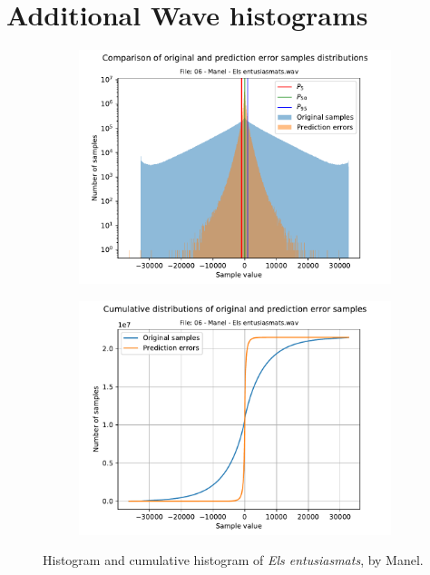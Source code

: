 \chapter{Additional Wave histograms} \label{ch:wave_hists}
\begin{figure}[h!]
	\centering
	\begin{subfigure}{0.45\textwidth}
		\centering
		\includegraphics[width=\linewidth]{images/wave_hists/06 - Manel - Els entusiasmats.wav_hist.pdf}
	\end{subfigure}%
	\begin{subfigure}{0.45\textwidth}
		\centering
		\includegraphics[width=\linewidth]{images/wave_hists/06 - Manel - Els entusiasmats.wav_hist_cum.pdf}
	\end{subfigure}
	\caption{Histogram and cumulative histogram of \textit{Els entusiasmats}, by Manel.}
	\label{fig:entusiasmats_manel}
\end{figure}

